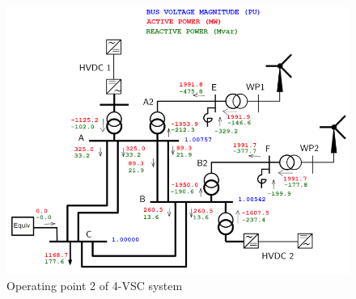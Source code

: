\documentclass{report}
\begin{document}
\begin{figure}[H]
    \centering
    \includegraphics[scale = 0.6]{Figure_4VSC/4VSC_OP2.PNG}
    \caption{Operating point 2 of 4-VSC system}
    \label{fig:4VSC_OP2}
\end{figure}
\end{document}
